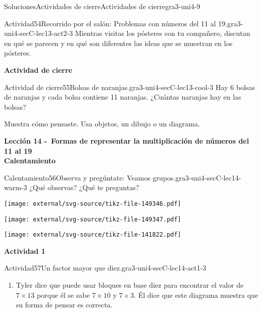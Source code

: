 \documentclass[twoside,10pt,]{article}
\begin{document}
\begin{solutions-section}{Soluciones}{Actividades de cierre}{}{Actividades de cierre}{}{}{gra3-uni4-9}
\begin{activitysolution}{Actividad}{54}{Recorrido por el salón: Problemas con números del 11 al 19.}{gra3-uni4-secC-lec13-act2-3}
Mientras visitas los pósteres con tu compañero, discutan en qué se parecen y en qué son diferentes las ideas que se muestran en los pósteres.%
\end{activitysolution}%
\par\medskip
\noindent\textbf{\large{}\space\textperiodcentered\space{}Actividad de cierre}
\begin{projectsolution}{Actividad de cierre}{55}{Bolsas de naranjas.}{gra3-uni4-secC-lec13-cool-3}%
Hay 6 bolsas de naranjas y cada bolsa contiene 11 naranjas. ¿Cuántas naranjas hay en las bolsas?%
\par
Muestra cómo pensaste. Usa objetos, un dibujo o un diagrama.%
\end{projectsolution}%
\par\medskip
\noindent\textbf{\large{}\space\textperiodcentered\space{}Lección 14 -~Formas de representar la multiplicación de números del 11 al 19\\
\space\textperiodcentered\space{}Calentamiento}
\begin{explorationsolution}{Calentamiento}{56}{Observa y pregúntate: Veamos grupos.}{gra3-uni4-secC-lec14-warm-3}%
¿Qué observas? ¿Qué te preguntas?%
\begin{sidebyside}{3}{0}{0}{0}%
\begin{sbspanel}{0.333333333333333}%
\texttt{[image: external/svg-source/tikz-file-149346.pdf]}
\end{sbspanel}%
\begin{sbspanel}{0.333333333333333}%
\texttt{[image: external/svg-source/tikz-file-149347.pdf]}
\end{sbspanel}%
\begin{sbspanel}{0.333333333333333}%
\texttt{[image: external/svg-source/tikz-file-141822.pdf]}
\end{sbspanel}%
\end{sidebyside}%
\end{explorationsolution}%
\par\medskip
\noindent\textbf{\large{}\space\textperiodcentered\space{}Actividad 1}
\begin{activitysolution}{Actividad}{57}{Un factor mayor que diez.}{gra3-uni4-secC-lec14-act1-3}%
%
\begin{enumerate}
\item{}Tyler dice que puede usar bloques en base diez para encontrar el valor de \(7\times 13\) porque él se sabe \(7\times 10\) y \(7\times 3\). Él dice que este diagrama muestra que su forma de pensar es correcta.%

\end{enumerate}
\end{activitysolution}
\end{solutions-section}
\end{document}
